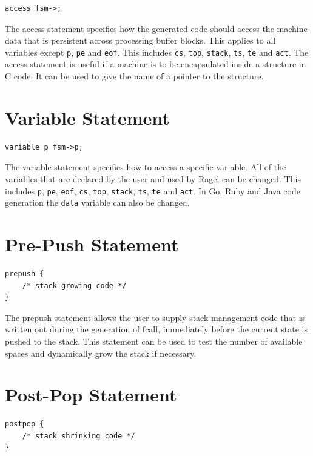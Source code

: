 \documentclass[letterpaper,11pt,oneside]{book}
\newcommand{\verbspace}{\vspace{10pt}}
\begin{document}
\begin{verbatim}
access fsm->;
\end{verbatim}
\verbspace

The access statement specifies how the generated code should
access the machine data that is persistent across processing buffer blocks.
This applies to all variables except \verb|p|, \verb|pe| and \verb|eof|. This includes
\verb|cs|, \verb|top|, \verb|stack|, \verb|ts|, \verb|te| and \verb|act|.
The access statement is useful if a machine is to be encapsulated inside a
structure in C code. It can be used to give the name of
a pointer to the structure.

\section{Variable Statement}

\begin{verbatim}
variable p fsm->p;
\end{verbatim}
\verbspace

The variable statement specifies how to access a specific
variable. All of the variables that are declared by the user and
used by Ragel can be changed. This includes \verb|p|, \verb|pe|, \verb|eof|, \verb|cs|,
\verb|top|, \verb|stack|, \verb|ts|, \verb|te| and \verb|act|.
In Go, Ruby and Java code generation the \verb|data| variable can also be changed.

\section{Pre-Push Statement}
\label{prepush}

\begin{verbatim}
prepush { 
    /* stack growing code */
}
\end{verbatim}
\verbspace

The prepush statement allows the user to supply stack management code that is
written out during the generation of fcall, immediately before the current
state is pushed to the stack. This statement can be used to test the number of
available spaces and dynamically grow the stack if necessary.

\section{Post-Pop Statement}
\label{postpop}

\begin{verbatim}
postpop { 
    /* stack shrinking code */
}
\end{verbatim}
\verbspace
\end{document}
